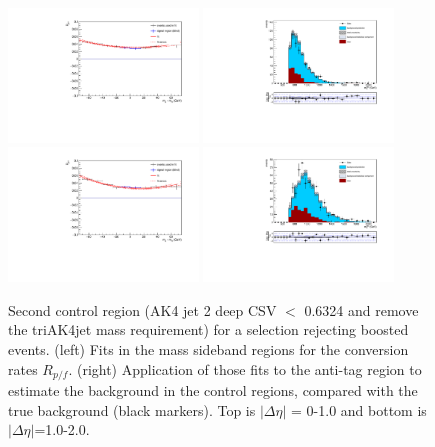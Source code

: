 \begin{figure}[h]
\centering
\includegraphics[width=0.45\textwidth]{F5/HH4b2p1SR_Fit_BG_boost_dEta0_CR2.pdf}
\includegraphics[width=0.45\textwidth]{F5/HH4b2p1_Plot_BG_boost_dEta0_CR2.pdf}\\
\includegraphics[width=0.45\textwidth]{F5/HH4b2p1SR_Fit_BG_boost_dEta1_CR2.pdf}
\includegraphics[width=0.45\textwidth]{F5/HH4b2p1_Plot_BG_boost_dEta1_CR2.pdf}
\caption{Second control region (AK4 jet 2 deep CSV $<$ 0.6324 and remove the triAK4jet mass requirement) for a selection rejecting boosted events. (left) Fits in the mass sideband regions for the conversion rates $R_{p/f}$. (right) Application of those fits to the anti-tag region to estimate the background in the control regions, compared with the true background (black markers). Top is $|\Delta\eta|$ = 0-1.0 and bottom is $|\Delta\eta|$=1.0-2.0.}
\label{fig:closuredataboost2}
\end{figure}


